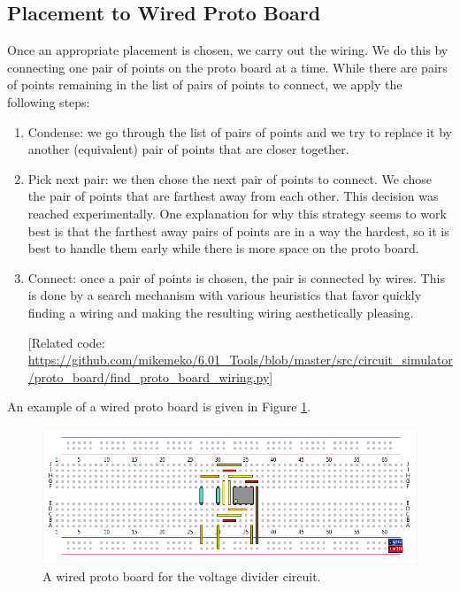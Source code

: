 \documentclass[12pt]{amsart}
\begin{document}
\subsection{Placement to Wired Proto Board}

Once an appropriate placement is chosen, we carry out the wiring. We do this by connecting one pair of points on the proto board at a time. While there are pairs of points remaining in the list of pairs of points to connect, we apply the following steps:

\begin{enumerate}
\item Condense: we go through the list of pairs of points and we try to replace it by another (equivalent) pair of points that are closer together.
\item Pick next pair: we then chose the next pair of points to connect. We chose the pair of points that are farthest away from each other. This decision was reached experimentally. One explanation for why this strategy seems to work best is that the farthest away pairs of points are in a way the hardest, so it is best to handle them early while there is more space on the proto board.
\item Connect: once a pair of points is chosen, the pair is connected by wires. This is done by a search mechanism with various heuristics that favor quickly finding a wiring and making the resulting wiring aesthetically pleasing.

[Related code: \url{https://github.com/mikemeko/6.01_Tools/blob/master/src/circuit_simulator/proto_board/find_proto_board_wiring.py}]
\end{enumerate}

An example of a wired proto board is given in Figure \ref{fig:wired}.

\begin{figure}
\includegraphics[width=\linewidth]{Images/Wired_Proto_Board.png}
\caption{A wired proto board for the voltage divider circuit.}
\label{fig:wired}
\end{figure}
\end{document}
